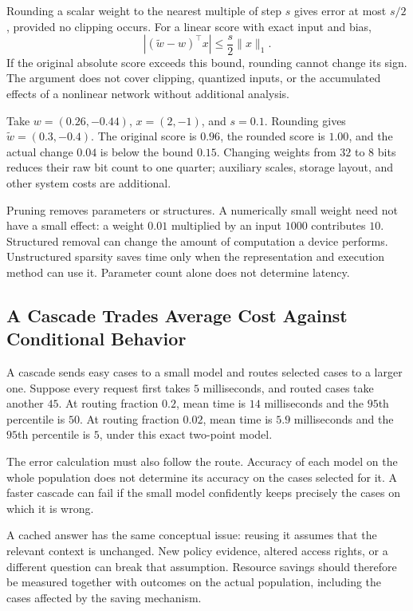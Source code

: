 Rounding a scalar weight to the nearest multiple of step $s$ gives error at most $s/2$, provided no clipping occurs. For a linear score with exact input and bias,
\[
\left|(\tilde w-w)^\top x\right|
\le\frac{s}{2}\|x\|_1.
\]
If the original absolute score exceeds this bound, rounding cannot change its sign. The argument does not cover clipping, quantized inputs, or the accumulated effects of a nonlinear network without additional analysis.

Take $w=(0.26,-0.44)$, $x=(2,-1)$, and $s=0.1$. Rounding gives $\tilde w=(0.3,-0.4)$. The original score is $0.96$, the rounded score is $1.00$, and the actual change $0.04$ is below the bound $0.15$. Changing weights from $32$ to $8$ bits reduces their raw bit count to one quarter; auxiliary scales, storage layout, and other system costs are additional.

Pruning removes parameters or structures. A numerically small weight need not have a small effect: a weight $0.01$ multiplied by an input $1000$ contributes $10$. Structured removal can change the amount of computation a device performs. Unstructured sparsity saves time only when the representation and execution method can use it. Parameter count alone does not determine latency.

\subsection{A Cascade Trades Average Cost Against Conditional Behavior}

A cascade sends easy cases to a small model and routes selected cases to a larger one. Suppose every request first takes $5$ milliseconds, and routed cases take another $45$. At routing fraction $0.2$, mean time is $14$ milliseconds and the $95$th percentile is $50$. At routing fraction $0.02$, mean time is $5.9$ milliseconds and the $95$th percentile is $5$, under this exact two-point model.

The error calculation must also follow the route. Accuracy of each model on the whole population does not determine its accuracy on the cases selected for it. A faster cascade can fail if the small model confidently keeps precisely the cases on which it is wrong.

A cached answer has the same conceptual issue: reusing it assumes that the relevant context is unchanged. New policy evidence, altered access rights, or a different question can break that assumption. Resource savings should therefore be measured together with outcomes on the actual population, including the cases affected by the saving mechanism.

